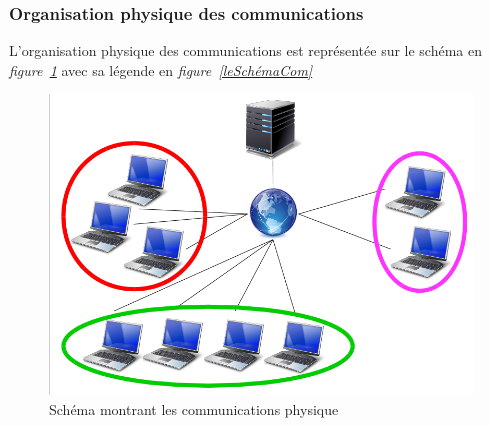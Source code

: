\documentclass[a4paper, titlepage]{livret}
\begin{document}
\subsubsection{Organisation physique des communications}

L’organisation physique des communications est représentée sur le schéma en \textit{figure~\ref{schémaCom}} avec sa légende en \textit{figure~\ref{leSchémaCom}}
  
  \begin{figure}[th]
      \begin{center}
        \includegraphics[scale=0.3]{Assets/s_r_1.png}
        \caption{Schéma montrant les communications physique}
        \label{schémaCom}
      \end{center}
    \end{figure}
\end{document}
